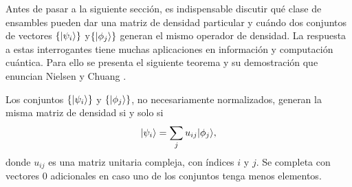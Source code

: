 Antes de pasar a la siguiente sección, es indispensable discutir qué clase de
ensambles pueden dar una matriz de densidad particular y cuándo dos conjuntos
de vectores $\{|\psi_i\rangle\}$ y$ \{|\phi_j\rangle \}$ generan el mismo operador de
densidad. La respuesta a estas interrogantes tiene muchas aplicaciones en
información y computación cuántica. Para ello se presenta el siguiente
teorema y su demostración que enuncian Nielsen y Chuang
{\cite{nielsen_chuang_2010}}. 
\begin{theorem}
Los conjuntos $\{|\psi_i\rangle\}$ y $ \{|\phi_j\rangle \}$, no necesariamente
normalizados, generan la misma matriz de densidad si y solo si
\begin{equation}\label{teorema2.4}
|\psi_i\rangle= \sum_{j}u_{ij}|\phi_j\rangle,
\end{equation} donde $u_{ij}$ es una matriz unitaria compleja, con índices $i$ y $j$. Se completa con vectores 0 adicionales en caso uno de los conjuntos tenga menos elementos.
\end{theorem}

